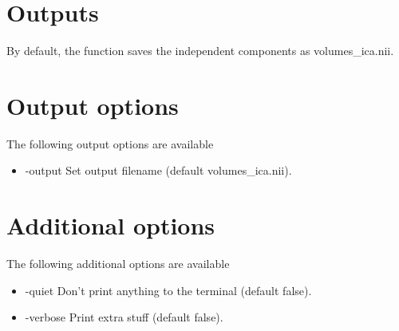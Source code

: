 \section{Outputs}

By default, the function saves the independent components as volumes\_ica.nii.
\section{Output options}

The following output options are available

\begin{itemize}

\item -output 
\newline \newline Set output filename (default volumes\_ica.nii).

\end{itemize}

\section{Additional options}

The following additional options are available

\begin{itemize}

\item -quiet 
\newline \newline Don't print anything to the terminal (default false). 

\item -verbose
\newline \newline Print extra stuff (default false). 

\end{itemize}


